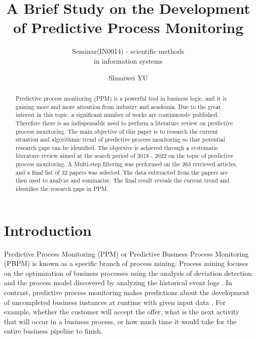 \documentclass[runningheads]{llncs}
\begin{document}
	\title{A Brief Study on the Development of Predictive Process Monitoring}
	\subtitle{Seminar(IN0014) - scientific methods \\ in information systems}
	\author{Shuaiwei YU  }
	\maketitle
	
	\begin{abstract}
		Predictive process monitoring (PPM) is a powerful tool in business logic, and it is gaining more and more attention from industry and academia. Due to the great interest in this topic, a significant number of works are continuously published. Therefore there is an indispensable need to perform a literature review on predictive process monitoring. The main objective of this paper is to research the current situation and algorithmic trend of predictive process monitoring so that potential research gaps can be identified. The objective is achieved through a systematic literature review aimed at the search period of 2018 - 2022 on the topic of predictive process monitoring. A Multi-step filtering was performed on the 263 retrieved articles, and a final list of 32 papers was selected. The data subtracted from the papers are then used to analyze and summarize. The final result reveals the current trend and identifies the research gaps in PPM.

	\end{abstract}
	
	\section{Introduction}
		Predictive Process Monitoring (PPM) or Predictive Business Process Monitoring (PBPM) is known as a specific branch of process mining. Process mining focuses on the optimization of business processes using the analysis of deviation detection and the process model discovered by analyzing the historical event logs \cite{art-8}. In contrast, predictive process monitoring makes predictions about the development of uncompleted business instances at runtime with given input data \cite{original}. For example, whether the customer will accept the offer, what is the next activity that will occur in a business process, or how much time it would take for the entire business pipeline to finish. 
	
\end{document}
